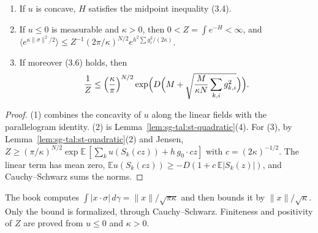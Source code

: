 \begin{lemma}\label{lem:sg-tal:st-partition}
  \leanok
\begin{enumerate}
\item If $u$ is concave, $H$ satisfies the midpoint inequality (3.4).
\item If $u\le0$ is measurable and $\kappa>0$, then $0<Z=\int e^{-H}<\infty$, and
$\langle e^{\kappa\|\sigma\|^2/2}\rangle\le Z^{-1}(2\pi/\kappa)^{N/2}e^{h^2\sum g_i^2/(2\kappa)}$.
\item If moreover (3.6) holds, then
\[
\frac1Z\le\Bigl(\frac\kappa\pi\Bigr)^{N/2}
\exp\Bigl(D\Bigl(M+\sqrt{\frac{M}{\kappa N}\sum_{k,i}g_{k,i}^2}\Bigr)\Bigr).
\]
\end{enumerate}
\end{lemma}
\begin{proof}
  \leanok
(1) combines the concavity of $u$ along the linear fields with the parallelogram identity. (2) is
Lemma~\ref{lem:sg-tal:st-quadratic}(4). For (3), by Lemma~\ref{lem:sg-tal:st-quadratic}(2) and Jensen,
$Z\ge(\pi/\kappa)^{N/2}\exp\mathbb E\,[\sum_ku(S_k(cz))+h\,g_0\cdot cz]$ with $c=(2\kappa)^{-1/2}$. The linear
term has mean zero, $\mathbb Eu(S_k(cz))\ge-D(1+c\,\mathbb E|S_k(z)|)$, and Cauchy--Schwarz sums the norms.
\end{proof}

\begin{remark}\label{rem:sg-tal:st-partition-diff}
The book computes $\int|x\cdot\sigma|\,d\gamma=\|x\|/\sqrt{\pi\kappa}$ and then bounds it by
$\|x\|/\sqrt\kappa$. Only the bound is formalized, through Cauchy--Schwarz. Finiteness and positivity of
$Z$ are proved from $u\le0$ and $\kappa>0$.
\end{remark}

